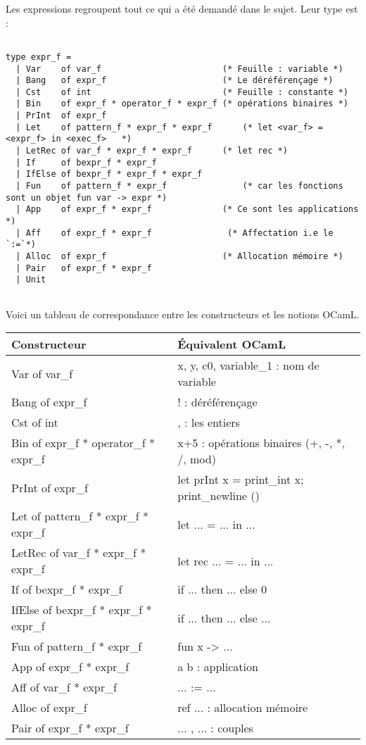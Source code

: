 \documentclass{article}
\newcommand\code[1]{{\fontfamily{lmtt}\selectfont #1}}
\begin{document}
	Les expressions regroupent tout ce qui a été demandé dans le sujet. Leur type est :
	
	\begin{verbatim}
	
type expr_f =
  | Var    of var_f                        (* Feuille : variable *)
  | Bang   of expr_f                       (* Le déréférençage *)
  | Cst    of int                          (* Feuille : constante *)
  | Bin    of expr_f * operator_f * expr_f (* opérations binaires *)
  | PrInt  of expr_f
  | Let    of pattern_f * expr_f * expr_f      (* let <var_f> = <expr_f> in <exec_f>   *)
  | LetRec of var_f * expr_f * expr_f      (* let rec *)
  | If     of bexpr_f * expr_f
  | IfElse of bexpr_f * expr_f * expr_f
  | Fun    of pattern_f * expr_f               (* car les fonctions sont un objet fun var -> expr *)
  | App    of expr_f * expr_f              (* Ce sont les applications *)
  | Aff    of expr_f * expr_f               (* Affectation i.e le `:=`*)
  | Alloc  of expr_f                       (* Allocation mémoire *)
  | Pair   of expr_f * expr_f
  | Unit


	\end{verbatim}
	
	\vspace{0.5cm}
	Voici un tableau de correspondance entre les constructeurs et les notions OCamL.
	
	\begin{center}
	\begin{tabular}{l | l}
		Constructeur & Équivalent OCamL \\
		\hline
		\code{Var of var\_f} & \code{x, y, c0, variable\_1} : nom de variable \\
  		\code{Bang of expr\_f} & \code{!} : déréférençage\\
		\code{Cst of int} & \code{0}, \code{1} : les entiers\\
		\code{Bin of expr\_f * operator\_f * expr\_f} & \code{x+5} : opérations binaires (\code{+, -, *, /, mod}) \\
  		\code{PrInt of expr\_f} & \code{let prInt x = print\_int x; print\_newline ()} \\
		\code{Let of pattern\_f * expr\_f * expr\_f} & \code{let ... = ... in ... } \\
		\code{LetRec of var\_f * expr\_f * expr\_f} & \code{let rec ... = ... in ... }\\
		\code{If of bexpr\_f * expr\_f} & \code{if ... then ... else 0} \\
		\code{IfElse of bexpr\_f * expr\_f * expr\_f} & \code{if ... then ... else ...} \\
		\code{Fun of pattern\_f * expr\_f} & \code{fun x -> ... } \\
		\code{App of expr\_f * expr\_f} & \code{ a b } : application \\
		\code{Aff of var\_f * expr\_f} & \code{... := ...} \\
  		\code{Alloc of expr\_f} & \code{ref ...} : allocation mémoire \\
  		\code{Pair of expr\_f * expr\_f} & \code{... , ...} : couples \\ 
	\end{tabular}
	\end{center}
	
\end{document}
